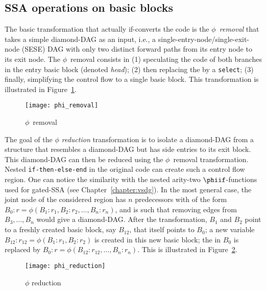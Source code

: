 \subsection{SSA operations on basic blocks}

The basic transformation that actually if-converts the code is the \emph{$\phi$~removal} that takes a simple diamond-DAG as an input, i.e., a single-entry-node/single-exit-node (SESE) DAG with only two distinct forward paths from its entry node to its exit node. 
The $\phi$~removal consists in (1) speculating the code of both branches in the entry basic block (denoted \textit{head}); 
(2) then replacing the \phifun by a \texttt{select}; 
(3) finally, simplifying the control flow to a single basic block. 
This transformation is illustrated in Figure~\ref{fig:phi_rem}.
\begin{figure}[h]
  \texttt{[image: phi\_removal]}
  \caption{$\phi$~removal\label{fig:phi_rem}}
\end{figure}

The goal of the \emph{$\phi$ reduction} transformation is to isolate a diamond-DAG from a structure that resembles a diamond-DAG but has side entries to its exit block. 
This diamond-DAG can then be reduced using the $\phi$~removal transformation. 
Nested \texttt{if-then-else-end} in the original code can create such a control flow region. 
One can notice the similarity with the nested arity-two $\phiif$-functions used for gated-SSA (see Chapter~\ref{chapter:vsdg}). 
In the most general case, the joint node of the considered region has $n$ predecessors with \phifuns of the form $B_0:r=\phi(B_1:r_1,B_2:r_2,\dots,B_n:r_n)$, and is such that removing edges from $B_3,\dots, B_n$ would give a diamond-DAG. 
After the transformation, $B_1$ and $B_2$ point to a freshly created basic block, say $B_{12}$, that itself points to $B_0$; 
a new variable $B_{12}:r_{12}=\phi(B_1:r_1,B_2:r_2)$ is created in this new basic block; 
the \phifun in $B_0$ is replaced by $B_0:r=\phi(B_{12}:r_{12},\dots,B_n:r_n)$. 
This is illustrated in Figure~\ref{fig:phi_red}.
\begin{figure}[h]
  \texttt{[image: phi\_reduction]}
  \caption{\label{fig:phi_red}$\phi$ reduction}
\end{figure}

